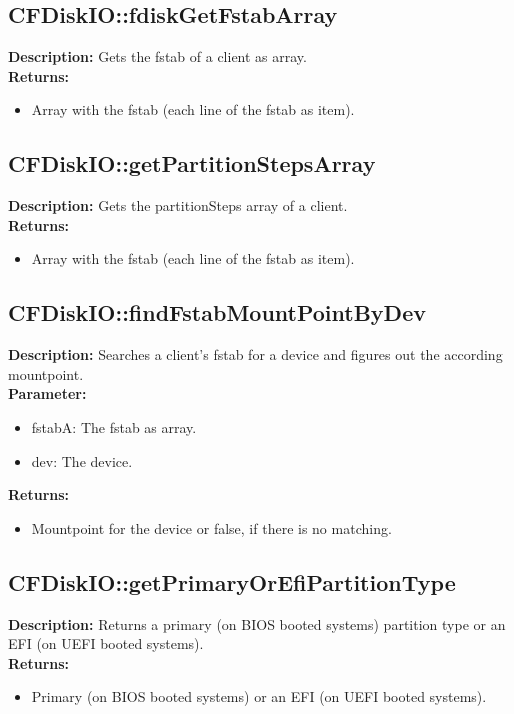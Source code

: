 \subsection{CFDiskIO::fdiskGetFstabArray}
\textbf{Description:} Gets the fstab of a client as array.\\
\textbf{Returns:}
\begin{itemize}
\item Array with the fstab (each line of the fstab as item).
\end{itemize}

\subsection{CFDiskIO::getPartitionStepsArray}
\textbf{Description:} Gets the partitionSteps array of a client.\\
\textbf{Returns:}
\begin{itemize}
\item Array with the fstab (each line of the fstab as item).
\end{itemize}

\subsection{CFDiskIO::findFstabMountPointByDev}
\textbf{Description:} Searches a client's fstab for a device and figures out the according mountpoint.\\
\textbf{Parameter:}
\begin{itemize}
\item fstabA: The fstab as array.
\item dev: The device.
\end{itemize}
\textbf{Returns:}
\begin{itemize}
\item Mountpoint for the device or false, if there is no matching.
\end{itemize}

\subsection{CFDiskIO::getPrimaryOrEfiPartitionType}
\textbf{Description:} Returns a primary (on BIOS booted systems) partition type or an EFI (on UEFI booted systems).\\
\textbf{Returns:}
\begin{itemize}
\item Primary (on BIOS booted systems) or an EFI (on UEFI booted systems).
\end{itemize}


